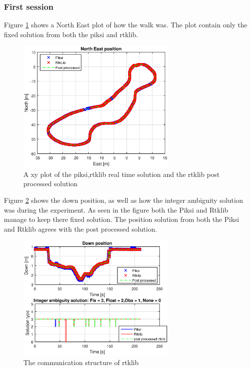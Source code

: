 \subsubsection{First session}
Figure \ref{figure:xywalk1} shows a North East plot of how the walk was. The plot contain only the fixed solution from both the piksi and rtklib. 
\begin{figure}[H]
	\centering
		\includegraphics[width=0.7\textwidth]{figs/plots/xywalk1.eps}
		\caption{A xy plot of the piksi,rtklib real time solution and the rtklib post processed solution}
		\label{figure:xywalk1}
\end{figure}
Figure \ref{figure:DownAndAmbwalk1} shows the down position, as well as how the integer ambiguity solution was during the experiment. As seen in the figure both the Piksi and Rtklib manage to keep there fixed solution. The position solution from both the Piksi and Rtklib agrees with the post processed solution. 
\begin{figure}[H]
	\centering
		\includegraphics[width=0.7\textwidth]{figs/plots/downWalk1.eps}
		\caption{The communication structure of rtklib}
		\label{figure:DownAndAmbwalk1}
\end{figure}

